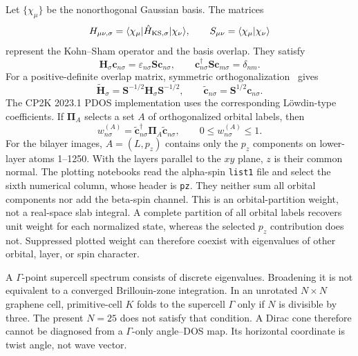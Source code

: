 \documentclass[aps,prl,10pt,onecolumn,superscriptaddress,longbibliography]{revtex4-2}
\begin{document}
Let $\{\chi_\mu\}$ be the nonorthogonal Gaussian basis. The matrices
\begin{equation}
 H_{\mu\nu,\sigma}=\langle\chi_\mu|\hat H_{\rm KS,\sigma}|\chi_\nu\rangle,
 \qquad S_{\mu\nu}=\langle\chi_\mu|\chi_\nu\rangle
\end{equation}
represent the Kohn--Sham operator and the basis overlap. They satisfy
\begin{equation}
 \bm H_\sigma\bm c_{n\sigma}=\varepsilon_{n\sigma}\bm S\bm c_{n\sigma},
 \qquad \bm c_{n\sigma}^{\dagger}\bm S\bm c_{m\sigma}=\delta_{nm}.
\end{equation}
For a positive-definite overlap matrix, symmetric orthogonalization~\cite{lowdin1950} gives
\begin{equation}
 \widetilde{\bm H}_\sigma=\bm S^{-1/2}\bm H_\sigma\bm S^{-1/2},
 \qquad \widetilde{\bm c}_{n\sigma}=\bm S^{1/2}\bm c_{n\sigma}.
\end{equation}
The CP2K 2023.1 PDOS implementation uses the corresponding L\"owdin-type coefficients. If $\bm\Pi_A$ selects a set $A$ of orthogonalized orbital labels, then
\begin{equation}
 w^{(A)}_{n\sigma}=\widetilde{\bm c}_{n\sigma}^{\dagger}\bm\Pi_A
 \widetilde{\bm c}_{n\sigma},\qquad 0\leq w^{(A)}_{n\sigma}\leq1.
\end{equation}
For the bilayer images, $A=(L,p_z)$ contains only the $p_z$ components on lower-layer atoms 1--1250. With the layers parallel to the $xy$ plane, $z$ is their common normal. The plotting notebooks read the alpha-spin \texttt{list1} file and select the sixth numerical column, whose header is \texttt{pz}. They neither sum all orbital components nor add the beta-spin channel. This is an orbital-partition weight, not a real-space slab integral. A complete partition of all orbital labels recovers unit weight for each normalized state, whereas the selected $p_z$ contribution does not. Suppressed plotted weight can therefore coexist with eigenvalues of other orbital, layer, or spin character.

A $\Gamma$-point supercell spectrum consists of discrete eigenvalues. Broadening it is not equivalent to a converged Brillouin-zone integration. In an unrotated $N\times N$ graphene cell, primitive-cell $K$ folds to the supercell $\Gamma$ only if $N$ is divisible by three. The present $N=25$ does not satisfy that condition. A Dirac cone therefore cannot be diagnosed from a $\Gamma$-only angle--DOS map. Its horizontal coordinate is twist angle, not wave vector.
\end{document}
